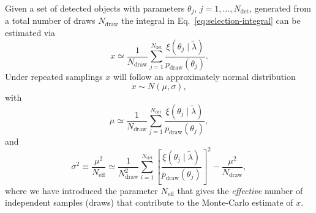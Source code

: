 \documentclass[modern]{aastex62}
\newcommand{\Ndraw}{N_\mathrm{draw}}
\newcommand{\Ndet}{N_\mathrm{det}}
\newcommand{\Neff}{N_\mathrm{eff}}
\newcommand{\pdraw}{p_\mathrm{draw}}
\begin{document}
Given a set of detected objects with parameters $\theta_j$, $j = 1, \ldots,
\Ndet$, generated from a total number of draws $\Ndraw$ the integral in Eq.\
\eqref{eq:selection-integral} can be estimated via
%
\begin{equation}
  \label{eq:simple-monte-carlo-estimate}
  x \simeq \frac{1}{\Ndraw} \sum_{j=1}^{\Ndet} \frac{\xi\left( \theta_j \mid \tilde{\lambda} \right)}{\pdraw\left( \theta_j \right)}.
\end{equation}
%
Under repeated samplings $x$ will follow an approximately normal distribution
%
\begin{equation}
    x \sim N\left( \mu, \sigma \right),
\end{equation}
%
with
%
\begin{equation}
  \mu \simeq \frac{1}{\Ndraw} \sum_{j=1}^{\Ndet} \frac{\xi\left( \theta_j \mid \tilde{\lambda} \right)}{\pdraw\left( \theta_j \right)} ,
\end{equation}
%
and
%
\begin{equation}
    \sigma^2 \equiv \frac{\mu^2}{\Neff} \simeq \frac{1}{\Ndraw^2} \sum_{i=1}^{\Ndet} \left[ \frac{\xi\left( \theta_j \mid \tilde{\lambda} \right)}{\pdraw\left( \theta_j \right)} \right]^2 - \frac{\mu^2}{\Ndraw},
\end{equation}
%
where we have introduced the parameter $\Neff$ that gives the \emph{effective}
number of independent samples (draws) that contribute to the Monte-Carlo
estimate of $x$.
\end{document}
